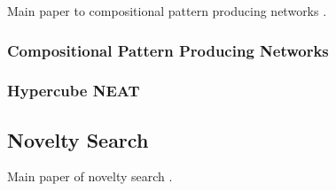 \cite{komosinski2001comparison}

Main paper to compositional pattern producing networks \cite{stanley2007compositional}.\\





\subsubsection{Compositional Pattern Producing Networks}
\cite{secretan2008picbreeder}






\subsubsection{Hypercube NEAT}
\cite{verbancsics2011constraining}
\cite{picbreederSite}
\cite{endlessforms}




\subsection{Novelty Search}
Main paper of novelty search \cite{lehman2011abandoning}.\\
\cite{lehman2010revising}
\cite{mouret2011novelty}
\cite{risi2009novelty}
\cite{mouret2012algorithm}


 
